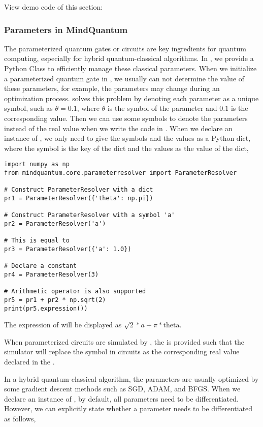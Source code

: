 View demo code of this section: 

\subsubsection{Parameters in MindQuantum}
The parameterized quantum gates or circuits are key ingredients for quantum computing, especially for hybrid quantum-classical algorithms.
In \MindQuantum, we provide a Python Class  to efficiently manage these classical parameters.
When we initialize a parameterized quantum gate in \MindQuantum, we usually can not determine the value of these parameters, for example, the parameters may change during an optimization process.
\ParameterResolver solves this problem by
denoting each parameter as a unique symbol, such as $\theta=0.1$, where $\theta$ is the symbol of the parameter and $0.1$ is the corresponding value.
Then we can use some symbols to denote the parameters instead of the real value when we write the code in \MindQuantum.
When we declare an instance of \ParameterResolver, we only need to give the symbols and the values as a Python dict, where the symbol is the key of the dict and the values as the value of the dict,

\begin{lstlisting}
import numpy as np
from mindquantum.core.parameterresolver import ParameterResolver

# Construct ParameterResolver with a dict
pr1 = ParameterResolver({'theta': np.pi})

# Construct ParameterResolver with a symbol 'a'
pr2 = ParameterResolver('a')

# This is equal to
pr3 = ParameterResolver({'a': 1.0})

# Declare a constant
pr4 = ParameterResolver(3)

# Arithmetic operator is also supported
pr5 = pr1 + pr2 * np.sqrt(2)
print(pr5.expression())
\end{lstlisting}

The expression of  will be displayed as $\sqrt{2}*a + \pi*\text{theta}$.

When parameterized circuits are simulated by \MindQuantum, the \ParameterResolver is provided such that the simulator will replace the symbol in circuits as the corresponding real value declared in the \ParameterResolver.

In a hybrid quantum-classical algorithm, the parameters are usually optimized by some gradient descent methods such as SGD, ADAM, and BFGS. When we declare an instance of \ParameterResolver, by default, all parameters need to be differentiated.
However, we can explicitly state whether a parameter needs to be differentiated as follows,

